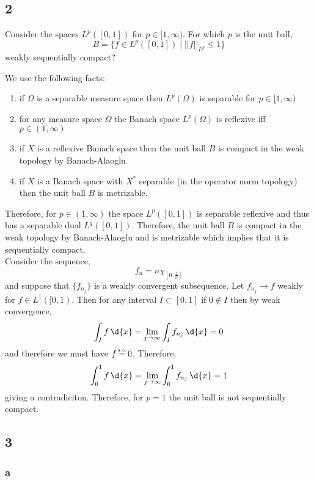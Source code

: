 \documentclass[12pt]{article}
\newcommand\eqae{\mathrel{\stackrel{\makebox[0pt]{\mbox{\normalfont\tiny a.e.}}}{=}}}
\begin{document}
\subsection{2}

\begin{exercise}
Consider the spaces $L^p([0,1])$ for $p \in [1, \infty)$. For which $p$ is the unit ball,
\[ B = \{ f \in L^p([0,1]) \mid || f ||_{L^p} \le 1 \} \]
weakly sequentially compact?
\end{exercise}

We use the following facts:

\begin{enumerate}
\item if $\Omega$ is a separable measure space then $L^p(\Omega)$ is separable for $p \in [1, \infty)$ 
\item for any measure space $\Omega$ the Banach space $L^p(\Omega)$ is reflexive iff $p \in (1, \infty)$
\item if $X$ is a reflexive Banach space then the unit ball $B$ is compact in the weak topology by Banach-Alaoglu
\item if $X$ is a Banach space with $X^*$ separable (in the operator norm topology) then the unit ball $B$ is metrizable.
\end{enumerate}

Therefore, for $p \in (1, \infty)$ the space $L^p([0,1])$ is separable reflexive and thus has a separable dual $L^q([0,1])$. Therefore, the unit ball $B$ is compact in the weak topology by Banach-Alaoglu and is metrizable which implies that it is sequentially compact. 
\bigskip\\
Consider the sequence,
\[ f_n = n \chi_{[0, \frac{1}{n}]}  \]
and suppose that $\{ f_{n_j} \}$ is a weakly convergent subsequence. Let $f_{n_j} \to f$ weakly for $f \in L^1([0,1)$. Then for any interval $I \subset [0,1]$ if $0 \notin I$ then by weak convergence,
\[ \int_I f \, \d{x} = \lim_{j \to \infty} \int_I f_{n_j} \, \d{x}  = 0 \]
and therefore we must have $f \eqae 0$. Therefore,
\[ \int_0^1 f \, \d{x} = \lim_{j \to \infty} \int_0^1 f_{n_j} \, \d{x} = 1 \]
giving a contradiciton. Therefore, for $p = 1$ the unit ball is not sequentially compact.

\subsection{3}

\subsubsection{a}
\end{document}
